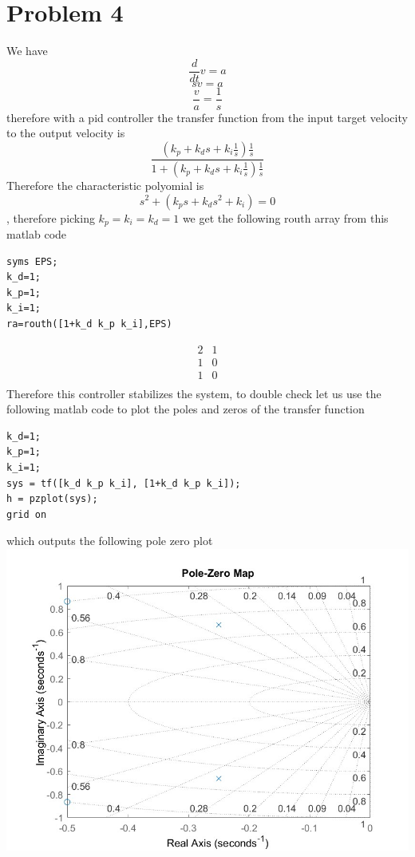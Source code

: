 \documentclass[12pt]{article}
\begin{document}
\section*{Problem 4}
We have
$$\frac{d}{dt}v=a$$
$$sv=a$$
$$\frac{v}{a}=\frac{1}{s}$$
therefore with a pid controller the transfer function from the input target velocity to the output velocity is 
$$\frac{(k_p+k_ds+k_i\frac{1}{s})\frac{1}{s}}{1+(k_p+k_ds+k_i\frac{1}{s})\frac{1}{s}}$$
Therefore the characteristic polyomial is 
$$s^2+(k_ps+k_ds^2+k_i)=0$$, therefore picking $k_p=k_i=k_d=1$ we get the following routh array from this matlab code
\begin{verbatim}
syms EPS;
k_d=1;
k_p=1;
k_i=1;
ra=routh([1+k_d k_p k_i],EPS)
\end{verbatim}
$$\begin{matrix}
    2 & 1\\
    1 & 0\\
    1 & 0\\
\end{matrix}$$
Therefore this controller stabilizes the system, to double check let us use the following matlab code to plot the poles and zeros of the transfer function
\begin{verbatim}
k_d=1;
k_p=1;
k_i=1;
sys = tf([k_d k_p k_i], [1+k_d k_p k_i]);
h = pzplot(sys);
grid on
\end{verbatim}
which outputs the following pole zero plot\\
\includegraphics[scale=0.4]{Problem4Fig1.jpg}\\
\end{document}
